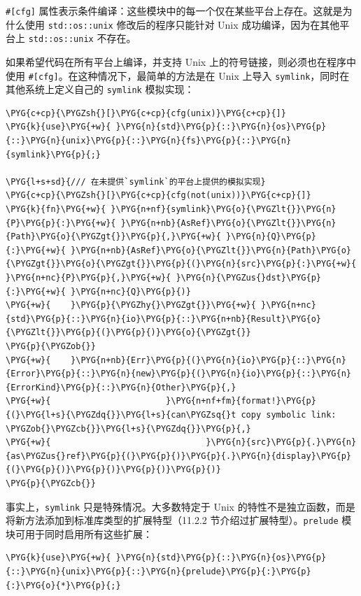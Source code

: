 \texttt{\#[cfg]} 属性表示条件编译：这些模块中的每一个仅在某些平台上存在。这就是为什么使用 \texttt{std::os::unix} 修改后的程序只能针对 Unix 成功编译，因为在其他平台上 \texttt{std::os::unix} 不存在。

如果希望代码在所有平台上编译，并支持 Unix 上的符号链接，则必须也在程序中使用 \texttt{\#[cfg]}。在这种情况下，最简单的方法是在 Unix 上导入 \texttt{symlink}，同时在其他系统上定义自己的 \texttt{symlink} 模拟实现：

\begin{Verbatim}[commandchars=\\\{\},breaklines=true,breakanywhere=true,fontsize=\codefont,xleftmargin=17bp]
\PYG{c+cp}{\PYGZsh{}[}\PYG{c+cp}{cfg(unix)}\PYG{c+cp}{]}
\PYG{k}{use}\PYG{+w}{ }\PYG{n}{std}\PYG{p}{::}\PYG{n}{os}\PYG{p}{::}\PYG{n}{unix}\PYG{p}{::}\PYG{n}{fs}\PYG{p}{::}\PYG{n}{symlink}\PYG{p}{;}

\PYG{l+s+sd}{/// 在未提供`symlink`的平台上提供的模拟实现}
\PYG{c+cp}{\PYGZsh{}[}\PYG{c+cp}{cfg(not(unix))}\PYG{c+cp}{]}
\PYG{k}{fn}\PYG{+w}{ }\PYG{n+nf}{symlink}\PYG{o}{\PYGZlt{}}\PYG{n}{P}\PYG{p}{:}\PYG{+w}{ }\PYG{n+nb}{AsRef}\PYG{o}{\PYGZlt{}}\PYG{n}{Path}\PYG{o}{\PYGZgt{}}\PYG{p}{,}\PYG{+w}{ }\PYG{n}{Q}\PYG{p}{:}\PYG{+w}{ }\PYG{n+nb}{AsRef}\PYG{o}{\PYGZlt{}}\PYG{n}{Path}\PYG{o}{\PYGZgt{}}\PYG{o}{\PYGZgt{}}\PYG{p}{(}\PYG{n}{src}\PYG{p}{:}\PYG{+w}{ }\PYG{n+nc}{P}\PYG{p}{,}\PYG{+w}{ }\PYG{n}{\PYGZus{}dst}\PYG{p}{:}\PYG{+w}{ }\PYG{n+nc}{Q}\PYG{p}{)}
\PYG{+w}{    }\PYG{p}{\PYGZhy{}\PYGZgt{}}\PYG{+w}{ }\PYG{n+nc}{std}\PYG{p}{::}\PYG{n}{io}\PYG{p}{::}\PYG{n+nb}{Result}\PYG{o}{\PYGZlt{}}\PYG{p}{(}\PYG{p}{)}\PYG{o}{\PYGZgt{}}
\PYG{p}{\PYGZob{}}
\PYG{+w}{    }\PYG{n+nb}{Err}\PYG{p}{(}\PYG{n}{io}\PYG{p}{::}\PYG{n}{Error}\PYG{p}{::}\PYG{n}{new}\PYG{p}{(}\PYG{n}{io}\PYG{p}{::}\PYG{n}{ErrorKind}\PYG{p}{::}\PYG{n}{Other}\PYG{p}{,}
\PYG{+w}{                       }\PYG{n+nf+fm}{format!}\PYG{p}{(}\PYG{l+s}{\PYGZdq{}}\PYG{l+s}{can\PYGZsq{}t copy symbolic link: \PYGZob{}\PYGZcb{}}\PYG{l+s}{\PYGZdq{}}\PYG{p}{,}
\PYG{+w}{                               }\PYG{n}{src}\PYG{p}{.}\PYG{n}{as\PYGZus{}ref}\PYG{p}{(}\PYG{p}{)}\PYG{p}{.}\PYG{n}{display}\PYG{p}{(}\PYG{p}{)}\PYG{p}{)}\PYG{p}{)}\PYG{p}{)}
\PYG{p}{\PYGZcb{}}
\end{Verbatim}

事实上，\texttt{symlink} 只是特殊情况。大多数特定于 Unix 的特性不是独立函数，而是将新方法添加到标准库类型的扩展特型（11.2.2 节介绍过扩展特型）。\texttt{prelude} 模块可用于同时启用所有这些扩展：

\begin{Verbatim}[commandchars=\\\{\},breaklines=true,breakanywhere=true,fontsize=\codefont,xleftmargin=17bp]
\PYG{k}{use}\PYG{+w}{ }\PYG{n}{std}\PYG{p}{::}\PYG{n}{os}\PYG{p}{::}\PYG{n}{unix}\PYG{p}{::}\PYG{n}{prelude}\PYG{p}{:}\PYG{p}{:}\PYG{o}{*}\PYG{p}{;}
\end{Verbatim}

